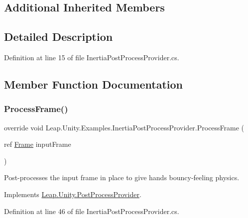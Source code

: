 \subsection*{Additional Inherited Members}


\subsection{Detailed Description}


Definition at line 15 of file Inertia\+Post\+Process\+Provider.\+cs.



\subsection{Member Function Documentation}
\mbox{\label{class_leap_1_1_unity_1_1_examples_1_1_inertia_post_process_provider_af9c64ac46fd83f591cbbdb5e35e35213}} 
\subsubsection{\texorpdfstring{ProcessFrame()}{ProcessFrame()}}
{\footnotesize\ttfamily override void Leap.\+Unity.\+Examples.\+Inertia\+Post\+Process\+Provider.\+Process\+Frame (\begin{DoxyParamCaption}\item[{ref \mbox{\hyperlink{class_leap_1_1_frame}{Frame}}}]{input\+Frame }\end{DoxyParamCaption})\hspace{0.3cm}{\ttfamily [virtual]}}



Post-\/processes the input frame in place to give hands bouncy-\/feeling physics. 



Implements \mbox{\hyperlink{class_leap_1_1_unity_1_1_post_process_provider_aa24a78b3485fd2bbac1d6370dd65ddbe}{Leap.\+Unity.\+Post\+Process\+Provider}}.



Definition at line 46 of file Inertia\+Post\+Process\+Provider.\+cs.



